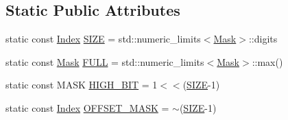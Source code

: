 \subsection*{Static Public Attributes}
\begin{DoxyCompactItemize}
\item 
static const \hyperlink{structMemChunk_a8fd5e130634e3d9ea4084153b2a242c8}{Index} \hyperlink{structMemChunk_a9f2b3f4f9c9d0b019f287be6796e2da3}{S\-I\-Z\-E} = std\-::numeric\-\_\-limits$<$\hyperlink{structMemChunk_aee69d5019f70b5b3b7196a60b80fb3ac}{Mask}$>$\-::digits
\item 
static const \hyperlink{structMemChunk_aee69d5019f70b5b3b7196a60b80fb3ac}{Mask} \hyperlink{structMemChunk_a313702b7ec939b184863aabd61f7b714}{F\-U\-L\-L} = std\-::numeric\-\_\-limits$<$\hyperlink{structMemChunk_aee69d5019f70b5b3b7196a60b80fb3ac}{Mask}$>$\-::max()
\item 
static const M\-A\-S\-K \hyperlink{structMemChunk_a73881b56059fddd1c7151c205d6d806c}{H\-I\-G\-H\-\_\-\-B\-I\-T} = 1$<$$<$(\hyperlink{structMemChunk_a9f2b3f4f9c9d0b019f287be6796e2da3}{S\-I\-Z\-E}-\/1)
\item 
static const \hyperlink{structMemChunk_a8fd5e130634e3d9ea4084153b2a242c8}{Index} \hyperlink{structMemChunk_a242fdf6095dc196c2700db11c31cab91}{O\-F\-F\-S\-E\-T\-\_\-\-M\-A\-S\-K} = $\sim$(\hyperlink{structMemChunk_a9f2b3f4f9c9d0b019f287be6796e2da3}{S\-I\-Z\-E}-\/1)
\end{DoxyCompactItemize}


